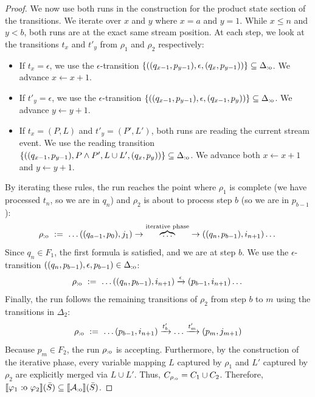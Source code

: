 \begin{proof}
We now use both runs in the construction for the product state section of the transitions. We iterate over $x$ and $y$ where $x = a$ and $y = 1$. While $x \leq n$ and $y < b$, both runs are at the exact same stream position. At each step, we look at the transitions $t_x$ and $t'_y$ from $\rho_1$ and $\rho_2$ respectively:
\begin{itemize}
	\item If $t_x = \epsilon$, we use the $\epsilon$-transition $\{((q_{x-1}, p_{y-1}), \epsilon, (q_{x}, p_{y-1}))\} \subseteq \Delta_{\text{:o}}$. We advance $x \gets x+1$.
	\item If $t'_y = \epsilon$, we use the $\epsilon$-transition $\{((q_{x-1}, p_{y-1}), \epsilon, (q_{x-1}, p_{y}))\} \subseteq \Delta_{\text{:o}}$. We advance $y \gets y+1$.
	\item If $t_x = (P, L)$ and $t'_y = (P', L')$, both runs are reading the current stream event. We use the reading transition $\{((q_{x-1}, p_{y-1}), P \land P', L \cup L', (q_{x}, p_{y}))\} \subseteq \Delta_{\text{:o}}$. We advance both $x \gets x+1$ and $y \gets y+1$.
\end{itemize}
By iterating these rules, the run reaches the point where $\rho_1$ is complete (we have processed $t_n$, so we are in $q_n$) and $\rho_2$ is about to process step $b$ (so we are in $p_{b-1}$):
\[ 
\rho_{\text{:o}} \ := \ \dots ((q_{a-1}, p_0), j_1) \rightarrow \overbrace{\dots}^{\text{iterative phase}} \rightarrow ((q_{n}, p_{b-1}), i_{n+1})  \dots
\]
Since $q_{n} \in F_1$, the first formula is satisfied, and we are at step $b$. We use the $\epsilon$-transition $((q_{n}, p_{b-1}), \epsilon, p_{b-1}) \in \Delta_{\text{:o}}$:
\[ 
\rho_{\text{:o}} \ := \ \dots ((q_{n}, p_{b-1}), i_{n+1}) \xrightarrow{\epsilon} (p_{b-1}, i_{n+1})  \dots 
\]
Finally, the run follows the remaining transitions of $\rho_2$ from step $b$ to $m$ using the transitions in $\Delta_2$:
\[ \rho_{\text{:o}} \ := \ \dots (p_{b-1}, i_{n+1}) \xrightarrow{t'_b} \dots \xrightarrow{t'_m} (p_{m}, j_{m+1}) \]
Because $p_{m} \in F_2$, the run $\rho_{\text{:o}}$ is accepting. Furthermore, by the construction of the iterative phase, every variable mapping $L$ captured by $\rho_1$ and $L'$ captured by $\rho_2$ are explicitly merged via $L \cup L'$. Thus, $C_{\rho_{\text{:o}}} = C_1 \cup C_2$. Therefore, $\sem{\varphi_1 \overlap \varphi_2}(\Stream) \subseteq \sem{\cAoverlap}(\Stream)$.


\end{proof}
